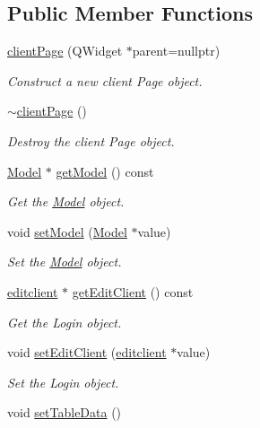 \subsection*{Public Member Functions}
\begin{DoxyCompactItemize}
\item 
\hyperlink{classclientPage_ad0e43d381003fa34cf0151fc96896da3}{client\+Page} (Q\+Widget $\ast$parent=nullptr)
\begin{DoxyCompactList}\small\item\em Construct a new client Page object. \end{DoxyCompactList}\item 
\hyperlink{classclientPage_af0c9562c16a80c54686adbc6f9637ebc}{$\sim$client\+Page} ()
\begin{DoxyCompactList}\small\item\em Destroy the client Page object. \end{DoxyCompactList}\item 
\hyperlink{classModel}{Model} $\ast$ \hyperlink{classclientPage_ab2876735aef44d0e72f7a57820148a27}{get\+Model} () const
\begin{DoxyCompactList}\small\item\em Get the \hyperlink{classModel}{Model} object. \end{DoxyCompactList}\item 
void \hyperlink{classclientPage_ac40930f54077f9a7050e046b535ed45c}{set\+Model} (\hyperlink{classModel}{Model} $\ast$value)
\begin{DoxyCompactList}\small\item\em Set the \hyperlink{classModel}{Model} object. \end{DoxyCompactList}\item 
\hyperlink{classeditclient}{editclient} $\ast$ \hyperlink{classclientPage_aa61872884ea03691d0ac38db4d0d01cc}{get\+Edit\+Client} () const
\begin{DoxyCompactList}\small\item\em Get the Login object. \end{DoxyCompactList}\item 
void \hyperlink{classclientPage_ab16c72bc9c44d5e833206133d692c857}{set\+Edit\+Client} (\hyperlink{classeditclient}{editclient} $\ast$value)
\begin{DoxyCompactList}\small\item\em Set the Login object. \end{DoxyCompactList}\item 
void \hyperlink{classclientPage_aa430c4866eaf46e93492d4b950443689}{set\+Table\+Data} ()

\end{DoxyCompactItemize}
